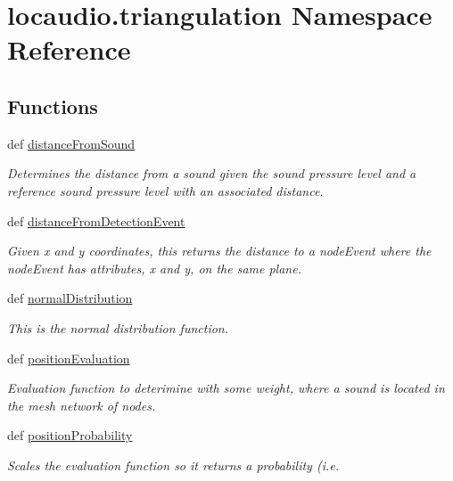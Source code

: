 \hypertarget{namespacelocaudio_1_1triangulation}{\section{locaudio.\-triangulation Namespace Reference}
\label{namespacelocaudio_1_1triangulation}
}
\subsection*{Functions}
\begin{DoxyCompactItemize}
\item 
def \hyperlink{namespacelocaudio_1_1triangulation_a4a7017521badc87c46d0b84774d70b2f}{distance\-From\-Sound}
\begin{DoxyCompactList}\small\item\em Determines the distance from a sound given the sound pressure level and a reference sound pressure level with an associated distance. \end{DoxyCompactList}\item 
def \hyperlink{namespacelocaudio_1_1triangulation_ac52a12426ddad7f84fd8fdce6d53a7e0}{distance\-From\-Detection\-Event}
\begin{DoxyCompactList}\small\item\em Given x and y coordinates, this returns the distance to a node\-Event where the node\-Event has attributes, x and y, on the same plane. \end{DoxyCompactList}\item 
def \hyperlink{namespacelocaudio_1_1triangulation_aeda79115af2a41e618d834fe29a63104}{normal\-Distribution}
\begin{DoxyCompactList}\small\item\em This is the normal distribution function. \end{DoxyCompactList}\item 
def \hyperlink{namespacelocaudio_1_1triangulation_af600bbadd299c94825b159b5df236f6f}{position\-Evaluation}
\begin{DoxyCompactList}\small\item\em Evaluation function to deterimine with some weight, where a sound is located in the mesh network of nodes. \end{DoxyCompactList}\item 
def \hyperlink{namespacelocaudio_1_1triangulation_af708227f069b847392f730d13060cce8}{position\-Probability}
\begin{DoxyCompactList}\small\item\em Scales the evaluation function so it returns a probability (i.\-e. \end{DoxyCompactList}\item 

\end{DoxyCompactItemize}
